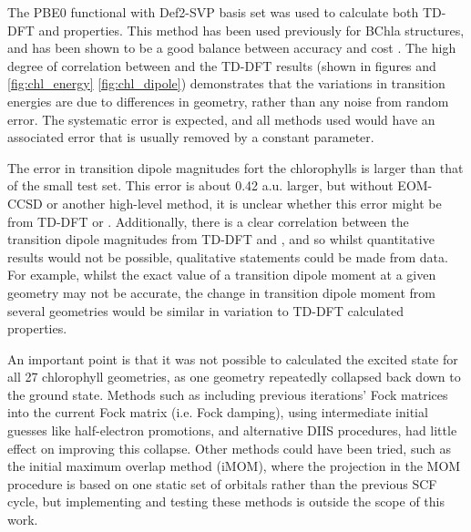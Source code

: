 The PBE0 functional with Def2-SVP basis set \cite{Adamo1999, Schafer1992} was used
to calculate both TD-DFT and \dscf properties. This method has been used previously
for BChla structures, and has been shown to be a good balance between accuracy and 
cost \cite{Stross2016}. The high degree of correlation between \dscf and the TD-DFT
results (shown in figures and \ref{fig:chl_energy} \ref{fig:chl_dipole}) demonstrates
that the variations in transition energies are due to differences in geometry, rather
than any noise from random error. The systematic error is expected, and all methods
used would have an associated error that is usually removed by a constant parameter.

The error in transition dipole magnitudes fort the chlorophylls is larger than that
of the small test set. This error is about 0.42 a.u. larger, but without EOM-CCSD 
or another high-level method, it is unclear whether this error might be from TD-DFT 
or \dscf. Additionally, there is a clear correlation between the transition dipole
magnitudes from TD-DFT and \dscf, and so whilst quantitative results would not be
possible, qualitative statements could be made from \dscf data. For example, whilst 
the exact value of a transition dipole moment at a given geometry may not be accurate, 
the change in transition dipole moment from several geometries would be similar 
in variation to TD-DFT calculated properties.

An important point is that it was not possible to calculated the excited state for
all 27 chlorophyll geometries, as one geometry repeatedly collapsed back down to
the ground state. Methods such as including previous iterations' Fock matrices into
the current Fock matrix (i.e. Fock damping), using intermediate initial guesses 
like half-electron promotions, and alternative DIIS procedures, had little effect 
on improving this collapse. Other methods could have been tried, such as the initial
maximum overlap method (iMOM), where the projection in the MOM procedure is based 
on one static set of orbitals rather than the previous SCF cycle, but implementing
and testing these methods is outside the scope of this work.

\afterpartskip
